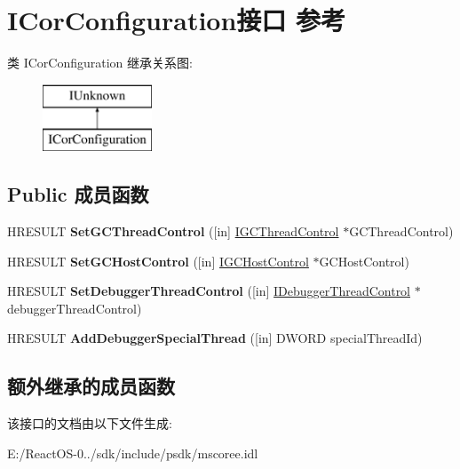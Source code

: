\hypertarget{interface_i_cor_configuration}{}\section{I\+Cor\+Configuration接口 参考}
\label{interface_i_cor_configuration}
类 I\+Cor\+Configuration 继承关系图\+:\begin{figure}[H]
\begin{center}
\leavevmode
\includegraphics[height=2.000000cm]{interface_i_cor_configuration}
\end{center}
\end{figure}
\subsection*{Public 成员函数}
\begin{DoxyCompactItemize}
\item 
\mbox{\label{interface_i_cor_configuration_a2780787c2d5b09ad5791a57bf76954a1}} 
H\+R\+E\+S\+U\+LT {\bfseries Set\+G\+C\+Thread\+Control} (\mbox{[}in\mbox{]} \hyperlink{interface_i_g_c_thread_control}{I\+G\+C\+Thread\+Control} $\ast$G\+C\+Thread\+Control)
\item 
\mbox{\label{interface_i_cor_configuration_a9fab6433e9ab91ad591dc75743051264}} 
H\+R\+E\+S\+U\+LT {\bfseries Set\+G\+C\+Host\+Control} (\mbox{[}in\mbox{]} \hyperlink{interface_i_g_c_host_control}{I\+G\+C\+Host\+Control} $\ast$G\+C\+Host\+Control)
\item 
\mbox{\label{interface_i_cor_configuration_aa27b7c69de072a897d1df9d63b6afdb7}} 
H\+R\+E\+S\+U\+LT {\bfseries Set\+Debugger\+Thread\+Control} (\mbox{[}in\mbox{]} \hyperlink{interface_i_debugger_thread_control}{I\+Debugger\+Thread\+Control} $\ast$debugger\+Thread\+Control)
\item 
\mbox{\label{interface_i_cor_configuration_ae1cf35a7d0c7b1361dc24bd87e9881ea}} 
H\+R\+E\+S\+U\+LT {\bfseries Add\+Debugger\+Special\+Thread} (\mbox{[}in\mbox{]} D\+W\+O\+RD special\+Thread\+Id)
\end{DoxyCompactItemize}
\subsection*{额外继承的成员函数}


该接口的文档由以下文件生成\+:\begin{DoxyCompactItemize}
\item 
E\+:/\+React\+O\+S-\/0../sdk/include/psdk/mscoree.\+idl\end{DoxyCompactItemize}
